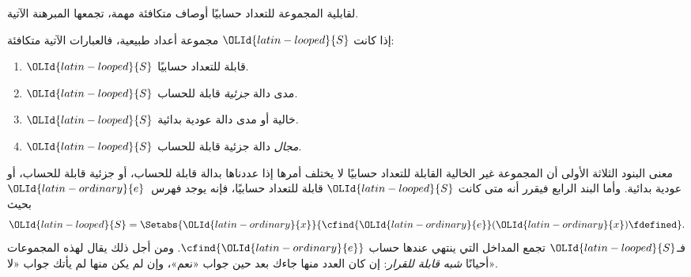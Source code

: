 \documentclass[../../../include/open-logic-section]{subfiles}
\begin{document}


لقابلية المجموعة للتعداد حسابيًا أوصاف متكافئة مهمة، تجمعها
المبرهنة الآتية.

\begin{thm}
إذا كانت ${\OLId{latin-looped}{S}}$ مجموعة أعداد طبيعية، فالعبارات الآتية متكافئة:
\begin{enumerate}
\item{} ${\OLId{latin-looped}{S}}$ قابلة للتعداد حسابيًا.
\item{} ${\OLId{latin-looped}{S}}$ مدى دالة \emph{جزئية} قابلة للحساب.
\item{} ${\OLId{latin-looped}{S}}$ خالية أو مدى دالة عودية بدائية.
\item{} ${\OLId{latin-looped}{S}}$ \emph{مجال} دالة جزئية قابلة للحساب.
\end{enumerate}
\end{thm}

\begin{explain}
معنى البنود الثلاثة الأولى أن المجموعة غير
الخالية القابلة للتعداد حسابيًا لا يختلف أمرها إذا عددناها بدالة قابلة للحساب، أو جزئية
قابلة للحساب، أو عودية بدائية. وأما البند الرابع فيقرر أنه متى كانت
${\OLId{latin-looped}{S}}$ قابلة للتعداد حسابيًا، فإنه يوجد فهرس~${\OLId{latin-ordinary}{e}}$ بحيث
\[
{\OLId{latin-looped}{S}} = \Setabs{{\OLId{latin-ordinary}{x}}}{\cfind{{\OLId{latin-ordinary}{e}}}({\OLId{latin-ordinary}{x}}) \fdefined}.
\]
فـ${\OLId{latin-looped}{S}}$ تجمع المداخل التي ينتهي عندها حساب
$\cfind{{\OLId{latin-ordinary}{e}}}$. ومن أجل ذلك يقال لهذه المجموعات أحيانًا
\emph{شبه قابلة للقرار}: إن كان العدد منها جاءك بعد حين جواب
«نعم»، وإن لم يكن منها لم يأتك جواب «لا».{}
\end{explain}
\end{document}
